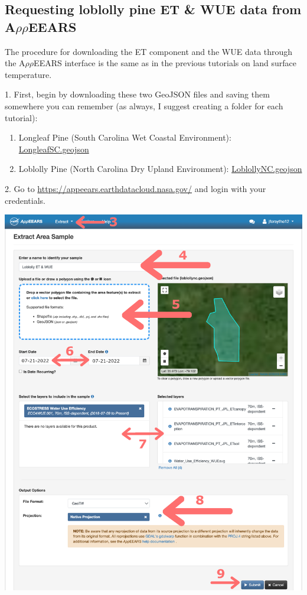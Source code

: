 \documentclass[oneside,a4paper,11pt,explicit]{book}
\begin{document}
\subsection{Requesting loblolly pine ET \& WUE data from A$\rho\rho$EEARS}

The procedure for downloading the ET component and the WUE data through the A$\rho\rho$EEARS interface is the same as in the previous tutorials on land surface temperature.

1. First, begin by downloading these two GeoJSON files and saving them somewhere you can remember (as always, I suggest creating a folder for each tutorial):

\begin{enumerate}
	\item Longleaf Pine (South Carolina Wet Coastal Environment): \href{https://jeremydforsythe.github.io/icecream-tutorials/Tutorial9_WaterUseEfficiency/LongleafSC Shapefile/LongleafSC.geojson}{LongleafSC.geojson}
	\item Loblolly Pine (North Carolina Dry Upland Environment): \href{https://jeremydforsythe.github.io/icecream-tutorials/Tutorial9_WaterUseEfficiency/LoblollyNC Shapefile/LoblollyNC.geojson}{LoblollyNC.geojson}
\end{enumerate}
 


2. Go to \href{https://appeears.earthdatacloud.nasa.gov/}{https://appeears.earthdatacloud.nasa.gov/} and login with your credentials. 

\centerline{\includegraphics[width=.75\textwidth]{WUERequest.png}}
\end{document}
